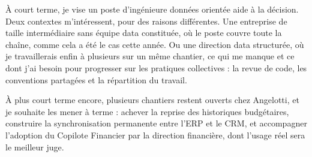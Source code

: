À court terme, je vise un poste d'ingénieure données orientée aide à la décision. Deux contextes
m'intéressent, pour des raisons différentes. Une entreprise de taille intermédiaire sans équipe
data constituée, où le poste couvre toute la chaîne, comme cela a été le cas cette année. Ou une
direction data structurée, où je travaillerais enfin à plusieurs sur un même chantier, ce qui me
manque et ce dont j'ai besoin pour progresser sur les pratiques collectives : la revue de code,
les conventions partagées et la répartition du travail.

À plus court terme encore, plusieurs chantiers restent ouverts chez Angelotti, et je souhaite
les mener à terme : achever la reprise des historiques budgétaires, construire la
synchronisation permanente entre l'ERP et le CRM, et accompagner l'adoption du Copilote
Financier par la direction financière, dont l'usage réel sera le meilleur juge.
